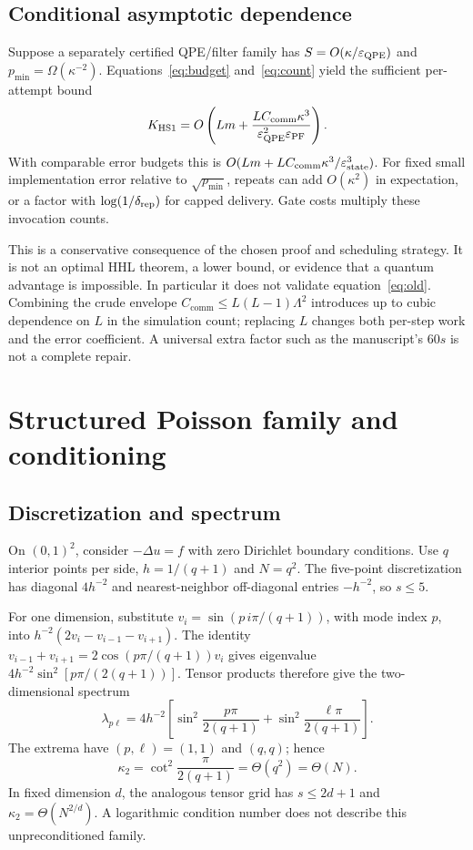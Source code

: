 \documentclass[11pt,a4paper]{article}
\newcommand{\C}{C_{\mathrm{comm}}}
\newcommand{\eps}{\varepsilon}
\newcommand{\HS}{K_{\mathrm{HS1}}}
\begin{document}
\subsection{Conditional asymptotic dependence}
Suppose a separately certified QPE/filter family has $S=O(\kappa/\eps_{\rm QPE})$ and $p_{\min}=\Omega(\kappa^{-2})$. Equations~\eqref{eq:budget} and~\eqref{eq:count} yield the sufficient per-attempt bound
\begin{equation}\label{eq:conditional}
 \HS=O\left(Lm+
 \frac{L\C\kappa^3}{\eps_{\rm QPE}^2\eps_{\rm PF}}\right).
\end{equation}
With comparable error budgets this is $O(Lm+L\C\kappa^3/\eps_{\rm state}^3)$. For fixed small implementation error relative to $\sqrt{p_{\min}}$, repeats can add $O(\kappa^2)$ in expectation, or a factor with $\log(1/\delta_{\rm rep})$ for capped delivery. Gate costs multiply these invocation counts.

This is a conservative consequence of the chosen proof and scheduling strategy. It is not an optimal HHL theorem, a lower bound, or evidence that a quantum advantage is impossible. In particular it does not validate equation~\eqref{eq:old}. Combining the crude envelope $\C\leq L(L-1)\Lambda^2$ introduces up to cubic dependence on $L$ in the simulation count; replacing $L$ changes both per-step work and the error coefficient. A universal extra factor such as the manuscript's $60s$ is not a complete repair.

\section{Structured Poisson family and conditioning}
\subsection{Discretization and spectrum}
On $(0,1)^2$, consider $-\Delta u=f$ with zero Dirichlet boundary conditions. Use $q$ interior points per side, $h=1/(q+1)$ and $N=q^2$. The five-point discretization has diagonal $4h^{-2}$ and nearest-neighbor off-diagonal entries $-h^{-2}$, so $s\leq5$.

For one dimension, substitute $v_i=\sin(p\,i\pi/(q+1))$, with mode index $p$, into $h^{-2}(2v_i-v_{i-1}-v_{i+1})$. The identity $v_{i-1}+v_{i+1}=2\cos(p\pi/(q+1))v_i$ gives eigenvalue $4h^{-2}\sin^2[p\pi/(2(q+1))]$. Tensor products therefore give the two-dimensional spectrum
\begin{equation}
 \lambda_{p\ell}=4h^{-2}\left[
 \sin^2\frac{p\pi}{2(q+1)}+\sin^2\frac{\ell\pi}{2(q+1)}\right].
\end{equation}
The extrema have $(p,\ell)=(1,1)$ and $(q,q)$; hence
\begin{equation}\label{eq:pdek}
 \kappa_2=\cot^2\frac{\pi}{2(q+1)}=\Theta(q^2)=\Theta(N).
\end{equation}
In fixed dimension $d$, the analogous tensor grid has $s\leq2d+1$ and $\kappa_2=\Theta(N^{2/d})$. A logarithmic condition number does not describe this unpreconditioned family.
\end{document}
